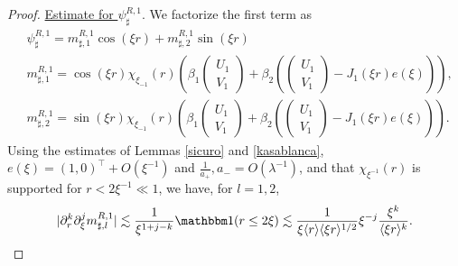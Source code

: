 \documentclass[11 pt]{amsart}
\theoremstyle{definition}
\theoremstyle{remark}
\numberwithin{equation}{section}
\begin{document}
\begin{proof}
\noindent \underline{Estimate for $\psi_\sharp^{R,1}$}. We factorize the first term as
\begin{align*}
& \psi^{R,1}_\sharp=m^{R,1}_{\sharp,1}\cos(\xi r)+m^{R,1}_{\sharp,2}\sin(\xi r) \\
& m^{R,1}_{\sharp,1}= \cos(\xi r)\chi_{\xi_{-1}}(r)\left(\beta_1 \begin{pmatrix} U_1 \\V_1 \end{pmatrix}+\beta_2\left( \begin{pmatrix} U_1 \\V_1 \end{pmatrix}-J_1(\xi r)e(\xi)\right) \right),\\
& m^{R,1}_{\sharp,2}= \sin(\xi r)\chi_{\xi_{-1}}(r)\left(\beta_1 \begin{pmatrix} U_1 \\V_1 \end{pmatrix}+\beta_2\left( \begin{pmatrix} U_1 \\V_1 \end{pmatrix}-J_1(\xi r)e(\xi)\right) \right).
\end{align*}
Using the estimates of Lemmas \ref{sicuro} and \ref{kasablanca}, $e(\xi)=(1,0)^\top+O(\xi^{-1})$ and $\frac{1}{a_+},a_-=O(\lambda^{-1})$, and that $\chi_{\xi^{-1}}(r)$ is supported for $r<2\xi^{-1}\ll 1$, we have, for $l=1,2$,
\begin{equation} \label{bd:msharp-inter-1}
|\partial_r^k \partial_\xi^j m^{R,1}_{\sharp,l}|\lesssim \frac{1}{\xi^{1+j-k}}\mathbbm 1 (r\leq 2 \xi) \lesssim \frac{1}{\xi \langle r \rangle \langle \xi r \rangle^{1/2}} \xi^{- j} \frac{\xi^k}{\langle \xi r \rangle^k}.
\end{equation}



\end{proof}
\end{document}
